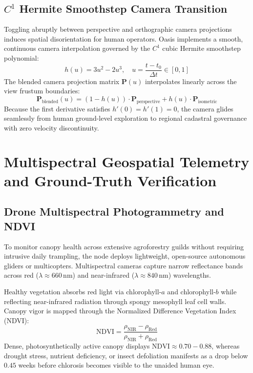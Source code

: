 \subsection{\texorpdfstring{$C^1$}{C1} Hermite Smoothstep Camera Transition}
Toggling abruptly between perspective and orthographic camera projections induces spatial disorientation for human operators. Oasis implements a smooth, continuous camera interpolation governed by the $C^1$ cubic Hermite smoothstep polynomial:
\begin{equation}
h(u) = 3u^2 - 2u^3, \quad u = \frac{t - t_0}{\Delta t} \in [0, 1]
\label{eq:hermite_smoothstep_cam}
\end{equation}
The blended camera projection matrix $\mathbf{P}(u)$ interpolates linearly across the view frustum boundaries:
\begin{equation}
\mathbf{P}_{\mathrm{blended}}(u) = (1 - h(u)) \cdot \mathbf{P}_{\mathrm{perspective}} + h(u) \cdot \mathbf{P}_{\mathrm{isometric}}
\label{eq:camera_matrix_blend}
\end{equation}
Because the first derivative satisfies $h'(0) = h'(1) = 0$, the camera glides seamlessly from human ground-level exploration to regional cadastral governance with zero velocity discontinuity.

\section{Multispectral Geospatial Telemetry and Ground-Truth Verification}
\label{sec:geospatial_telemetry}

\subsection{Drone Multispectral Photogrammetry and NDVI}
To monitor canopy health across extensive agroforestry guilds without requiring intrusive daily trampling, the node deploys lightweight, open-source autonomous gliders or multicopters. Multispectral cameras capture narrow reflectance bands across red ($\lambda \approx 660\,\mathrm{nm}$) and near-infrared ($\lambda \approx 840\,\mathrm{nm}$) wavelengths.

Healthy vegetation absorbs red light via chlorophyll-$a$ and chlorophyll-$b$ while reflecting near-infrared radiation through spongy mesophyll leaf cell walls. Canopy vigor is mapped through the Normalized Difference Vegetation Index (NDVI):
\begin{equation}
\mathrm{NDVI} = \frac{\rho_{\mathrm{NIR}} - \rho_{\mathrm{Red}}}{\rho_{\mathrm{NIR}} + \rho_{\mathrm{Red}}}
\label{eq:ndvi_equation}
\end{equation}
Dense, photosynthetically active canopy displays $\mathrm{NDVI} \approx 0.70 - 0.88$, whereas drought stress, nutrient deficiency, or insect defoliation manifests as a drop below $0.45$ weeks before chlorosis becomes visible to the unaided human eye.

